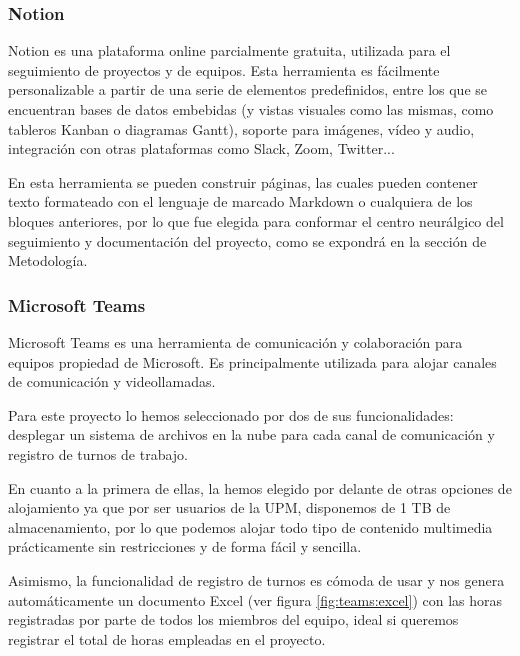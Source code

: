         \subsubsection{Notion}
            Notion es una plataforma online parcialmente gratuita, utilizada para el seguimiento de proyectos y de 
            equipos. Esta herramienta es fácilmente personalizable a partir de una serie de elementos predefinidos, 
            entre los que se encuentran bases de datos embebidas (y vistas visuales como las mismas, como tableros 
            Kanban o diagramas Gantt), soporte para imágenes, vídeo y audio, integración con otras plataformas como 
            Slack, Zoom, Twitter... 
                
            En esta herramienta se pueden construir páginas, las cuales pueden contener texto formateado con el 
            lenguaje de marcado Markdown o cualquiera de los bloques anteriores, por lo que fue elegida para conformar 
            el centro neurálgico del seguimiento y documentación del proyecto, como se expondrá en la sección de 
            Metodología. 
            
        \subsubsection{Microsoft Teams}
            Microsoft Teams es una herramienta de comunicación y colaboración para equipos propiedad de Microsoft. 
            Es principalmente utilizada para alojar canales de comunicación y videollamadas.
                
            Para este proyecto lo hemos seleccionado por dos de sus funcionalidades: desplegar un sistema de archivos 
            en la nube para cada canal de comunicación y registro de turnos de trabajo. 
            
            En cuanto a la primera de ellas, la hemos elegido por delante de otras opciones de alojamiento ya 
            que por ser usuarios de la UPM, disponemos de 1 TB de almacenamiento, por lo que podemos alojar todo 
            tipo de contenido multimedia prácticamente sin restricciones y de forma fácil y sencilla.
            
            Asimismo, la funcionalidad de registro de turnos es cómoda de usar y nos genera automáticamente un documento
            Excel (ver figura \ref{fig:teams:excel}) con las horas registradas por parte de todos los miembros del equipo, ideal si queremos registrar el 
            total de horas empleadas en el proyecto. 

